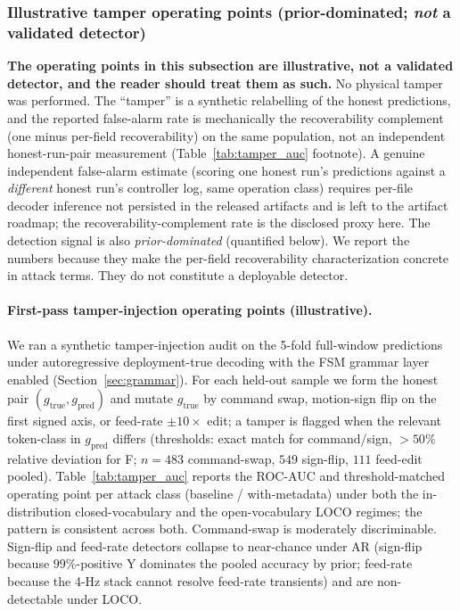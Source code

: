 \documentclass[sensors,article,submit,moreauthors,pdftex]{Definitions/mdpi}
\begin{document}
\subsubsection*{Illustrative tamper operating points (prior-dominated; \emph{not} a validated detector)}
\label{sec:disc-tamper-illustrative}

\noindent\textbf{The operating points in this subsection are illustrative, not a validated detector, and the reader should treat them as such.} No physical tamper was performed. The ``tamper'' is a synthetic relabelling of the honest predictions, and the reported false-alarm rate is mechanically the recoverability complement (one minus per-field recoverability) on the same population, not an independent honest-run-pair measurement (Table~\ref{tab:tamper_auc} footnote). A genuine independent false-alarm estimate (scoring one honest run's predictions against a \emph{different} honest run's controller log, same operation class) requires per-file decoder inference not persisted in the released artifacts and is left to the artifact roadmap; the recoverability-complement rate is the disclosed proxy here. The detection signal is also \emph{prior-dominated} (quantified below). We report the numbers because they make the per-field recoverability characterization concrete in attack terms. They do not constitute a deployable detector.

\paragraph{First-pass tamper-injection operating points (illustrative).} We ran a synthetic tamper-injection audit on the 5-fold full-window predictions under autoregressive deployment-true decoding with the FSM grammar layer enabled (Section~\ref{sec:grammar}). For each held-out sample we form the honest pair $(g_{\text{true}}, g_{\text{pred}})$ and mutate $g_{\text{true}}$ by command swap, motion-sign flip on the first signed axis, or feed-rate $\pm 10\times$ edit; a tamper is flagged when the relevant token-class in $g_{\text{pred}}$ differs (thresholds: exact match for command/sign, $>50\%$ relative deviation for F; $n\!=\!483$ command-swap, $549$ sign-flip, $111$ feed-edit pooled). Table~\ref{tab:tamper_auc} reports the ROC-AUC and threshold-matched operating point per attack class (baseline / with-metadata) under both the in-distribution closed-vocabulary and the open-vocabulary LOCO regimes; the pattern is consistent across both. Command-swap is moderately discriminable. Sign-flip and feed-rate detectors collapse to near-chance under AR (sign-flip because $99\%$-positive Y dominates the pooled accuracy by prior; feed-rate because the 4-Hz stack cannot resolve feed-rate transients) and are non-detectable under LOCO.
\end{document}
